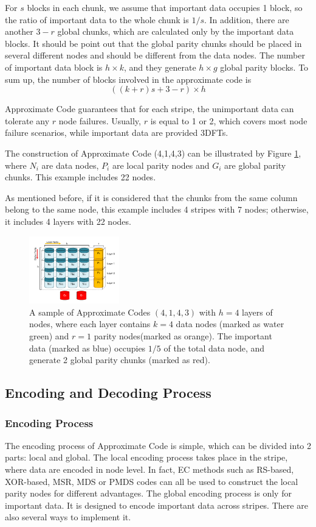 \documentclass[sigconf]{acmart}
\begin{document}
For $s$ blocks in each chunk, we assume that important data occupies 1 block, so the ratio of important data to the whole chunk is $1/s$.
In addition, there are another $3-r$ global chunks, which are calculated only by the important data blocks. It should be point out that the global parity chunks should be placed in several different nodes and should be different from the data nodes. 
The number of important data block is $h \times k$, and they generate $h \times g$ global parity blocks.
To sum up, the number of blocks involved in the approximate code is 
$$((k+r)s + 3-r) \times h$$

Approximate Code guarantees that for each stripe, the unimportant data can tolerate any $r$ node failures. Usually, $r$ is equal to 1 or 2, which covers most node failure scenarios, while important data are provided 3DFTs.

The construction of Approximate Code (4,1,4,3) can be illustrated by Figure \ref{fig-ap-41425}, where $N_i$ are data nodes, $P_{i}$ are local parity nodes and $G_i$ are global parity chunks. 
This example includes 22 nodes. 

As mentioned before, if it is considered that the chunks from the same column belong to the same node, this example includes 4 stripes with 7 nodes; otherwise, it includes 4 layers with 22 nodes.

\begin{figure}[h]
\centering
\includegraphics[width=0.35\textwidth]{photo/AP-kmha-v6.pdf}
\caption{A sample of Approximate Codes $(4,1,4,3)$ with $h=4$ layers of nodes, where each layer contains $k=4$ data nodes (marked as water green) and $r=1$ parity nodes(marked as orange).
The important data (marked as blue) occupies $1/5$ of the total data node, and generate 2 global parity chunks (marked as red).}
\label{fig-ap-41425}
\end{figure}

\iffalse
\subsection{Encoding and Decoding Process}
\subsubsection{Encoding Process}
The encoding process of Approximate Code is simple, which can be divided into 2 parts: local and global.
The local encoding process takes place in the stripe, where data are encoded in node level. In fact, EC methods such as RS-based, XOR-based, MSR, MDS or PMDS codes can all be used to construct the local parity nodes for different advantages.
The global encoding process is only for important data. It is designed to encode important data across stripes. There are also several ways to implement it.
\end{document}
